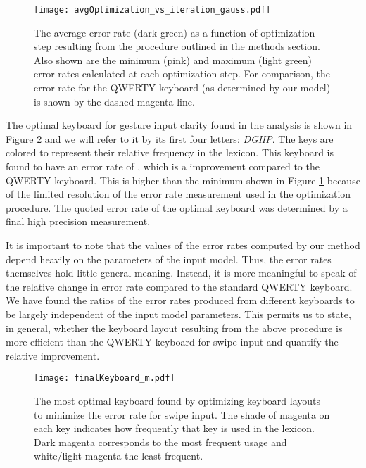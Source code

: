 \documentclass[final,1p,times,authoryear]{elsarticle}
\begin{document}
\begin{figure}[t]
\begin{centering}
\texttt{[image: avgOptimization\_vs\_iteration\_gauss.pdf]}
\par\end{centering}
\smallskip{}
\protect\caption{The average error rate (dark green) as a function of optimization
step resulting from the procedure outlined in the methods section.
Also shown are the minimum (pink) and maximum (light green) error
rates calculated at each optimization step. For comparison, the error
rate for the QWERTY keyboard (as determined by our model) is shown
by the dashed magenta line.\label{fig:The-Average-error}}
\end{figure}

The optimal keyboard for gesture input clarity found in the analysis is shown in Figure \ref{fig:The-most-optimal}
and we will refer to it by its first four letters: \textit{DGHP}.
The keys are colored to represent their relative frequency in the
lexicon. This keyboard is found to have an error rate of ,
which is a  improvement compared to the QWERTY keyboard.
This is higher than the minimum shown in Figure \ref{fig:The-Average-error}
because of the limited resolution of the error rate measurement used
in the optimization procedure. The quoted error rate of the optimal
keyboard was determined by a final high precision measurement.

It is important to note that the values of the error rates computed by
our method depend heavily on the parameters of the input model. Thus,
the error rates themselves hold little general meaning. Instead, it
is more meaningful to speak of the relative change in error rate compared
to the standard QWERTY keyboard. We have found the ratios of the error
rates produced from different keyboards to be largely independent
of the input model parameters. This permits us to state, in general,
whether the keyboard layout resulting from the above procedure is
more efficient than the QWERTY keyboard for swipe input and quantify
the relative improvement.

\begin{figure}[tbh]
\begin{centering}
\texttt{[image: finalKeyboard\_m.pdf]}
\par\end{centering}
\medskip{}
\protect\caption{The most optimal keyboard found by optimizing keyboard layouts to
minimize the error rate for swipe input. The shade of magenta on each
key indicates how frequently that key is used in the lexicon.
Dark magenta corresponds to the most frequent usage and white/light
magenta the least frequent. \label{fig:The-most-optimal}}
\end{figure}
\end{document}
